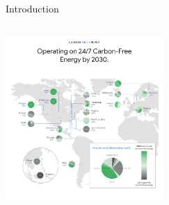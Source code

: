 \begin{frame}{Introduction}
{\begin{columns}[T]
    \begin{column}{6cm}
    \centering
    \includegraphics[width=6cm]{images/247-google-web.png}
    \vspace{.1cm}
  \end{column}

  \end{columns}

  }
\end{frame}


